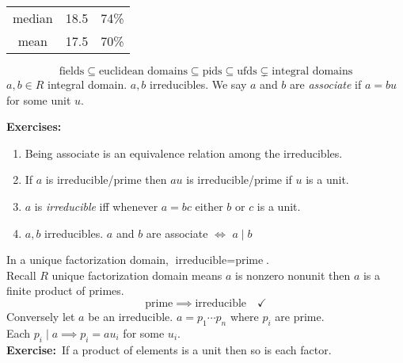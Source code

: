 \begin{tabular}{ccc}
median & 18.5 & 74\% \\
mean & 17.5 & 70\% \\
\end{tabular}
%
\[ \text{fields} \subseteq \text{euclidean domains} \subseteq \text{pids} \subseteq \text{ufds} \subsetneq \text{integral domains} \]
 $a,b\in R$ integral domain.  $a,b$ irreducibles.  We say $a$ and $b$ are \emph{associate} if $a=bu$ for some unit $u$.

\textbf{Exercises:}
\begin{enumerate}
\item Being associate is an equivalence relation among the irreducibles.
\item If $a$ is irreducible/prime then $au$ is irreducible/prime if $u$ is a unit.
\item $a$ is \emph{irreducible} iff whenever $a=bc$ either $b$ or $c$ is a unit.
\item $a,b$ irreducibles.  $a$ and $b$ are associate $\iff$ $a\mid b$
\end{enumerate}
\lem In a unique factorization domain, $\text{irreducible}=\text{prime}$. \\
\pf Recall $R$ unique factorization domain means $a$ is nonzero nonunit then $a$ is a finite product of primes.
\[ \text{prime}\implies\text{irreducible}\quad \checkmark \]
Conversely let $a$ be an irreducible.  $a=p_1\dotsm p_n$ where $p_i$ are prime. \\
Each $p_i\mid a\implies p_i=au_i$ for some $u_i$. \\
\textbf{Exercise:}~If a product of elements is a unit then so is each factor.

